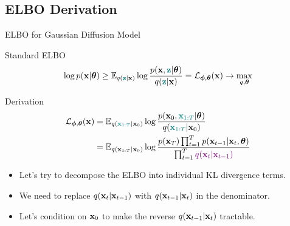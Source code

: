 \documentclass{beamer}
\begin{document}
\subsection{ELBO Derivation}
\begin{frame}{ELBO for Gaussian Diffusion Model}
    \begin{block}{Standard ELBO}
        \vspace{-0.3cm}
        \[
            \log p(\mathbf{x} | \boldsymbol{\theta}) \geq \mathbb{E}_{q({\color{teal}\mathbf{z}} | \mathbf{x})} \log \frac{p(\mathbf{x}, {\color{teal}\mathbf{z}} | \boldsymbol{\theta})}{q({\color{teal}\mathbf{z}} | \mathbf{x})} = \mathcal{L}_{\boldsymbol{\phi}, \boldsymbol{\theta}}(\mathbf{x}) \rightarrow \max_{q, \boldsymbol{\theta}}
        \]
        \vspace{-0.5cm}
    \end{block}
    \begin{block}{Derivation}
        \vspace{-0.5cm}
        \begin{align*}
            \mathcal{L}_{\boldsymbol{\phi}, \boldsymbol{\theta}}(\mathbf{x}) &= \mathbb{E}_{q({\color{teal}\mathbf{x}_{1:T}} | \mathbf{x}_0)} \log \frac{p(\mathbf{x}_0, {\color{teal}\mathbf{x}_{1:T}} | \boldsymbol{\theta})}{q({\color{teal}\mathbf{x}_{1:T}} | \mathbf{x}_0)} \\
            & = \mathbb{E}_{q(\mathbf{x}_{1:T} | \mathbf{x}_0)} \log \frac{p(\mathbf{x}_T) \prod_{t=1}^T p(\mathbf{x}_{t-1} | \mathbf{x}_t, \boldsymbol{\theta}) }{\prod_{t=1}^T {\color{violet}q(\mathbf{x}_t | \mathbf{x}_{t-1})}}
        \end{align*}
        \vspace{-0.3cm}
        \begin{itemize}
            \item Let's try to decompose the ELBO into individual KL divergence terms.
            \item We need to replace $q(\mathbf{x}_t | \mathbf{x}_{t - 1})$ with $q(\mathbf{x}_{t - 1} | \mathbf{x}_t)$ in the denominator.
            \item Let's condition on $\mathbf{x}_0$ to make the reverse $q(\mathbf{x}_{t - 1} | \mathbf{x}_t)$ tractable.
        \end{itemize}
    \end{block}
\end{frame}
\end{document}
